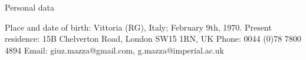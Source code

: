 \begin{rubric}{Personal data}

\entry*[2011]
Place and date of birth: Vittoria (RG), Italy; February 9th, 1970.
\entry*
Present residence: 15B Chelverton Road, London SW15 1RN, UK 
\entry*
Phone: 
0044 (0)78 7800 4894       %
\entry*
Email: giuz.mazza@gmail.com, g.mazza@imperial.ac.uk
\end{rubric}
